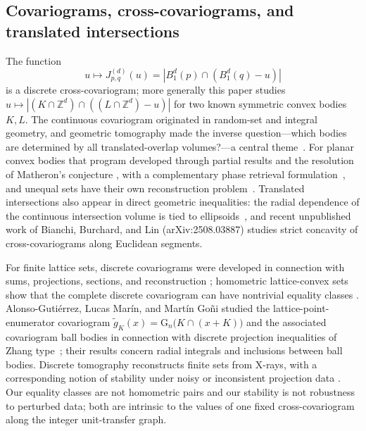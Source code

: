 \documentclass[pdflatex,sn-mathphys-num]{sn-jnl}
\theoremstyle{thmstyleone}
\theoremstyle{thmstylethree}
\theoremstyle{thmstyletwo}
\newcommand{\Z}{\mathbb Z}
\begin{document}
\subsection{Covariograms, cross-covariograms, and translated intersections}

The function
\[
 u\mapsto J_{p,q}^{(d)}(u)
 =
 \left|
 B_1^d(p)\cap(B_1^d(q)-u)
 \right|
\]
is a discrete cross-covariogram; more generally this paper studies
$u\mapsto |(K\cap\Z^d)\cap((L\cap\Z^d)-u)|$ for two known symmetric convex
bodies $K,L$.  The continuous covariogram originated in random-set and
integral geometry, and geometric tomography made the inverse
question---which bodies are determined by all translated-overlap
volumes?---a central theme~\cite{Matheron75,Gardner06,Bianchi23Survey}.
For planar convex bodies that program developed through partial results and
the resolution of Matheron's conjecture
\cite{Bianchi05Matheron,AverkovBianchi09}, with a complementary phase
retrieval formulation~\cite{BianchiGardnerKiderlen11}, and unequal sets have
their own reconstruction problem~\cite{Bianchi09Cross}.  Translated
intersections also appear in direct geometric inequalities: the radial
dependence of the continuous intersection volume is tied to
ellipsoids~\cite{MeyerReisnerSchmuck93}, and recent unpublished work of
Bianchi, Burchard, and Lin (arXiv:2508.03887) studies strict concavity of
cross-covariograms along Euclidean segments.

For finite lattice sets, discrete covariograms were developed in connection
with sums, projections, sections, and reconstruction
\cite{GGZ05,AverkovLangfeld12}; homometric lattice-convex sets show that the
complete discrete covariogram can have nontrivial equality classes
\cite{RosenblattSeymour82,AverkovLangfeld16}.  Alonso-Guti\'errez, Lucas
Mar\'in, and Mart\'in Go\~ni studied the lattice-point-enumerator
covariogram $\widetilde g_K(x)=\mathrm G_n\bigl(K\cap(x+K)\bigr)$ and the
associated covariogram ball bodies in connection with discrete projection
inequalities of Zhang type~\cite{AlonsoLucasMartinGoni25}; their results
concern radial integrals and inclusions between ball bodies.  Discrete
tomography reconstructs finite sets from X-rays, with a corresponding notion
of stability under noisy or inconsistent projection data
\cite{GardnerGritzmann97,AlpersGritzmann06}.  Our equality classes are not
homometric pairs and our stability is not robustness to perturbed data;
both are intrinsic to the values of one fixed cross-covariogram along the
integer unit-transfer graph.
\end{document}
